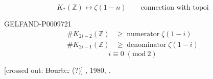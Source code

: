 \[
 K_*(\mathbb Z)\leftrightarrow\zeta(1-n)
 \qquad\text{connection with topoi}
\]

\begin{GelfandAdjacentEvidence}{GELFAND-P000972}{1}
\[
\begin{aligned}
 \#K_{2i-2}(\mathbb Z)&\geqslant\operatorname{numerator}\zeta(1-i)\\
 \#K_{2i-1}(\mathbb Z)&\geqslant\operatorname{denominator}\zeta(1-i)
\end{aligned}
\]
\[
 i\equiv0\;(\mathrm{mod}\ 2)
\]

[crossed out: \sout{Bourb…} (?)] , 1980, .
\end{GelfandAdjacentEvidence}


